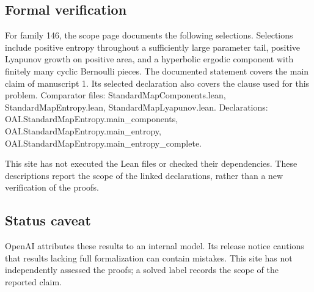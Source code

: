 \documentclass[11pt]{article}
\begin{document}
\subsection{Formal verification}
For family 146, the scope page documents the following selections. Selections include positive entropy throughout a sufficiently large parameter tail, positive Lyapunov growth on positive area, and a hyperbolic ergodic component with finitely many cyclic Bernoulli pieces. The documented statement covers the main claim of manuscript 1. Its selected declaration also covers the clause used for this problem. Comparator files: StandardMapComponents.lean, StandardMapEntropy.lean, StandardMapLyapunov.lean. Declarations: OAI.StandardMapEntropy.main\_components, OAI.StandardMapEntropy.main\_entropy, OAI.StandardMapEntropy.main\_entropy\_complete.

This site has not executed the Lean files or checked their dependencies. These descriptions report the scope of the linked declarations, rather than a new verification of the proofs.

\subsection{Status caveat}
OpenAI attributes these results to an internal model. Its release notice cautions that results lacking full formalization can contain mistakes. This site has not independently assessed the proofs; a solved label records the scope of the reported claim.
\end{document}
